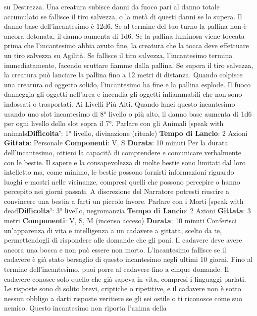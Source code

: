 \begin{multicols}{2}
su Destrezza. Una creatura subisce danni da fuoco pari
al danno totale accumulato se fallisce il tiro salvezza, o
la metà di questi danni se lo supera.
Il danno base dell’incantesimo è 12d6. Se al termine del
tuo turno la pallina non è ancora detonata, il danno
aumenta di 1d6.
Se la pallina luminosa viene toccata prima che
l’incantesimo abbia avuto fine, la creatura che la tocca
deve effettuare un tiro salvezza su Agilità. Se
fallisce il tiro salvezza, l’incantesimo termina
immediatamente, facendo eruttare fiamme dalla pallina.
Se supera il tiro salvezza, la creatura può lanciare la
pallina fino a 12 metri di distanza. Quando colpisce una
creatura od oggetto solido, l’incantesimo ha fine e la
pallina esplode.
Il fuoco danneggia gli oggetti nell’area e incendia gli
oggetti infiammabili che non sono indossati o
trasportati.
Ai Livelli Più Alti. Quando lanci questo incantesimo
usando uno slot incantesimo di 8° livello o più alto, il
danno base aumenta di 1d6 per ogni livello dello slot
sopra il 7°.
Parlare con gli Animali
[speak with animals\textbf{Difficolta'}:
1° livello, divinazione (rituale)
\textbf{Tempo di Lancio}: 2 Azioni
\textbf{Gittata}: Personale
\textbf{Componenti}: V, S
\textbf{Durata}: 10 minuti
Per la durata dell’incantesimo, ottieni la capacità di
comprendere e comunicare verbalmente con le bestie.
Il sapere e la consapevolezza di molte bestie sono
limitati dal loro intelletto ma, come minimo, le bestie
possono fornirti informazioni riguardo luoghi e mostri
nelle vicinanze, compresi quelli che possono percepire
o hanno percepito nei giorni passati. A discrezione del
Narratore potresti riuscire a convincere una bestia a farti un
piccolo favore.
Parlare con i Morti
[speak with dead\textbf{Difficolta'}:
3° livello, negromanzia
\textbf{Tempo di Lancio}: 2 Azioni
\textbf{Gittata}: 3 metri
\textbf{Componenti}: V, S, M (incenso acceso)
\textbf{Durata}: 10 minuti
Conferisci un’apparenza di vita e intelligenza a un
cadavere a gittata, scelto da te, permettendogli di
rispondere alle domande che gli poni. Il cadavere deve
avere ancora una bocca e non può essere non morto.
L’incantesimo fallisce se il cadavere è già stato
bersaglio di questo incantesimo negli ultimi 10 giorni.
Fino al termine dell’incantesimo, puoi porre al cadavere
fino a cinque domande. Il cadavere conosce solo quello
che già sapeva in vita, compresi i linguaggi parlati. Le
risposte sono di solito brevi, criptiche o ripetitive, e il
cadavere non è sotto nessun obbligo a darti risposte
veritiere se gli sei ostile o ti riconosce come suo
nemico. Questo incantesimo non riporta l’anima della

\end{multicols}
